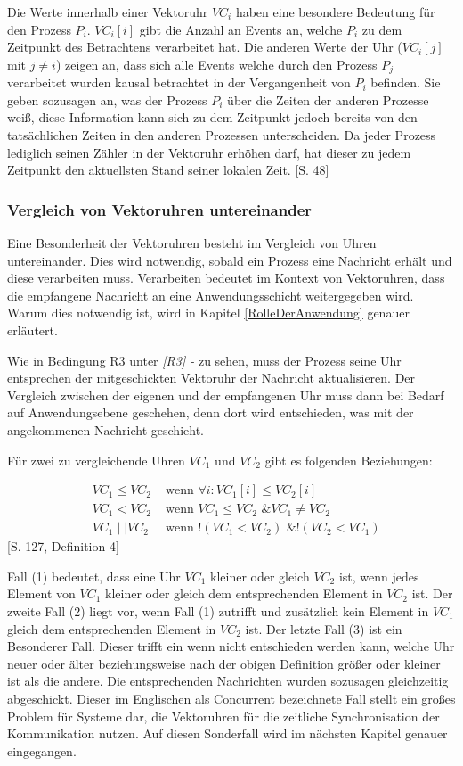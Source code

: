 Die Werte innerhalb einer Vektoruhr $VC_i$ haben eine besondere Bedeutung für den Prozess $P_i$. $VC_i[i]$ gibt die Anzahl an Events an, welche $P_i$ zu dem Zeitpunkt des Betrachtens verarbeitet hat. Die anderen Werte der Uhr ($VC_i[j]$ mit $j \neq i$) zeigen an, dass sich alle Events welche durch den Prozess $P_j$ verarbeitet wurden kausal betrachtet in der Vergangenheit von $P_i$ befinden. Sie geben sozusagen an, was der Prozess $P_i$ über die Zeiten der anderen Prozesse weiß, diese Information kann sich zu dem Zeitpunkt jedoch bereits von den tatsächlichen Zeiten in den anderen Prozessen unterscheiden. Da jeder Prozess lediglich seinen Zähler in der Vektoruhr erhöhen darf, hat dieser zu jedem Zeitpunkt den aktuellsten Stand seiner lokalen Zeit. \cite{singhal1992efficient}[S. 48]

\subsubsection{Vergleich von Vektoruhren untereinander}
\label{vergleich}
Eine Besonderheit der Vektoruhren besteht im Vergleich von Uhren untereinander. Dies wird notwendig, sobald ein Prozess eine Nachricht erhält und diese verarbeiten muss. Verarbeiten bedeutet im Kontext von Vektoruhren, dass die empfangene Nachricht an eine Anwendungsschicht weitergegeben wird. Warum dies notwendig ist, wird in Kapitel \ref{RolleDerAnwendung} genauer erläutert.

Wie in Bedingung R3 unter \textit{\ref{R3} - } zu sehen, muss der Prozess seine Uhr entsprechen der mitgeschickten Vektoruhr der Nachricht aktualisieren. Der Vergleich zwischen der eigenen und der empfangenen Uhr muss dann bei Bedarf auf Anwendungsebene geschehen, denn dort wird entschieden, was mit der angekommenen Nachricht geschieht.

Für zwei zu vergleichende Uhren $VC_1$ und $VC_2$ gibt es folgenden Beziehungen:

\begin{eqnarray}
&VC_1 \leq VC_2& \text{ wenn } \forall i : VC_1[i] \leq VC_2[i] \\
	&VC_1 < VC_2& \text{ wenn } VC_1 \leq VC_2 \text{ \& } VC_1 \neq VC_2 \\
	&VC_1 \mid \mid VC_2& \text{ wenn } !(VC_1 < VC_2) \text{ \& } !(VC_2 < VC_1)
\end{eqnarray}
\cite{Mattern88virtualtime}[S. 127, Definition 4]

Fall (1) bedeutet, dass eine Uhr $VC_1$ kleiner oder gleich $VC_2$ ist, wenn jedes Element von $VC_1$ kleiner oder gleich dem entsprechenden Element in $VC_2$ ist. Der zweite Fall (2) liegt vor, wenn Fall (1) zutrifft und zusätzlich kein Element in $VC_1$ gleich dem entsprechenden Element in $VC_2$ ist. 
Der letzte Fall (3) ist ein Besonderer Fall. Dieser trifft ein wenn nicht entschieden werden kann, welche Uhr neuer oder älter beziehungsweise nach der obigen Definition größer oder kleiner ist als die andere. Die entsprechenden Nachrichten wurden sozusagen gleichzeitig abgeschickt. Dieser im Englischen als \glqq Concurrent\glqq{} bezeichnete Fall stellt ein großes Problem für Systeme dar, die Vektoruhren für die zeitliche Synchronisation der Kommunikation nutzen. Auf diesen Sonderfall wird im nächsten Kapitel genauer eingegangen.

